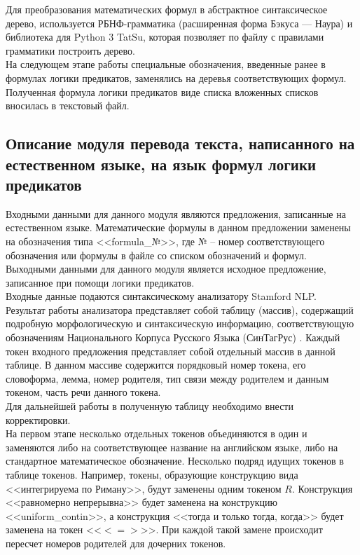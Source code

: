 \documentclass[12pt]{article}
\begin{document}
Для преобразования математических формул в абстрактное синтаксическое дерево, используется РБНФ-грамматика (расширенная форма Бэкуса — Наура) и библиотека для Python 3 TatSu, которая позволяет по файлу с правилами грамматики построить дерево. \\

На следующем этапе работы специальные обозначения, введенные ранее в формулах логики предикатов, заменялись на деревья соответствующих формул. Полученная формула логики предикатов виде списка вложенных списков вносилась в текстовый файл.  \\
 
\newpage
\subsection{Описание модуля перевода текста, написанного на естественном языке, на язык формул логики предикатов}
Входными данными для данного модуля являются предложения, записанные на естественном языке.  Математические формулы в данном предложении заменены на обозначения типа <<formula\_№>>, где № -- номер соответствующего обозначения или формулы в файле со списком обозначений и формул. Выходными данными для данного модуля является исходное предложение, записанное при помощи логики предикатов.\\

Входные данные подаются синтаксическому анализатору Stamford NLP. Результат работы анализатора представляет собой  таблицу (массив), содержащий подробную морфологическую и синтаксическую информацию, соответствующую обозначениям Национального Корпуса Русского Языка (СинТагРус) \cite{author17}.
Каждый токен входного предложения представляет собой отдельный массив в данной таблице. В данном массиве содержится порядковый номер токена, его словоформа, лемма, номер родителя, тип связи между родителем и данным токеном, часть речи данного токена. \\

Для дальнейшей работы в полученную таблицу необходимо внести корректировки. \\

На первом этапе несколько отдельных токенов объединяются в один и заменяются либо на соответствующее название на английском языке, либо на стандартное математическое обозначение. Несколько подряд идущих токенов в таблице токенов. Например, токены, образующие конструкцию вида <<интегрируема по Риману>>, будут заменены одним токеном $R$. Конструкция <<равномерно непрерывна>> будет заменена на конструкцию <<uniform\_contin>>, а конструкция <<тогда и только тогда, когда>> будет заменена на токен <<$<=>$>>. При каждой такой замене происходит пересчет номеров родителей для дочерних токенов.\\
\end{document}
